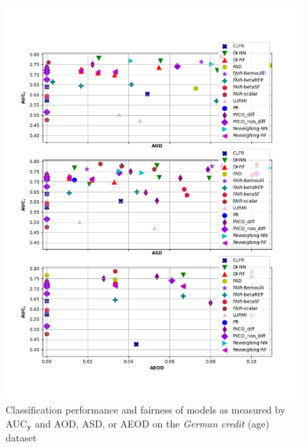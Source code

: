 \documentclass[preprint,12pt]{elsarticle}
\begin{document}
\begin{figure}
	\center
	\includegraphics[angle=0, width=1\textwidth]{Ger_age_all.png}
	\captionsetup{justification=centering}
	\caption{Classification performance and fairness of models as measured by AUC$_\mathbf{y}$ and AOD, ASD, or AEOD on the \textit{German credit} (age) dataset}
	\label{fig:Ger_age all}
	\vskip -0.2in
\end{figure}
\end{document}
